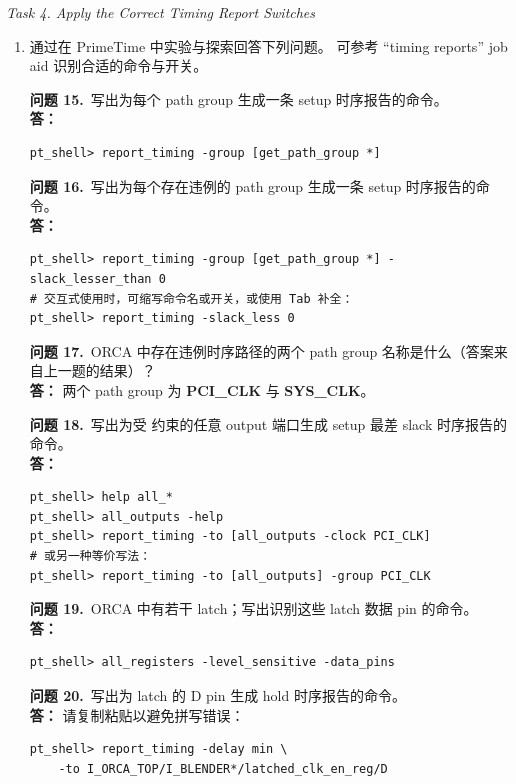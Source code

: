 \noindent\textit{Task 4. Apply the Correct Timing Report Switches}

\begin{enumerate}
  \item 通过在 PrimeTime 中实验与探索回答下列问题。
        可参考 ``timing reports'' job aid 识别合适的命令与开关。

\begin{questionBox}
\textbf{问题 15.}\ 写出为每个 path group 生成一条 setup 时序报告的命令。\\[0.35em]
\textbf{答：}\\
\begin{lstlisting}
pt_shell> report_timing -group [get_path_group *]
\end{lstlisting}

\textbf{问题 16.}\ 写出为每个存在违例的 path group 生成一条 setup 时序报告的命令。\\[0.35em]
\textbf{答：}\\
\begin{lstlisting}
pt_shell> report_timing -group [get_path_group *] -slack_lesser_than 0
# 交互式使用时，可缩写命令名或开关，或使用 Tab 补全：
pt_shell> report_timing -slack_less 0
\end{lstlisting}

\textbf{问题 17.}\ ORCA 中存在违例时序路径的两个 path group 名称是什么（答案来自上一题的结果）？\\[0.35em]
\textbf{答：} 两个 path group 为 \textbf{PCI\_CLK} 与 \textbf{SYS\_CLK}。

\textbf{问题 18.}\ 写出为受  约束的任意 output 端口生成 setup 最差 slack 时序报告的命令。\\[0.35em]
\textbf{答：}\\
\begin{lstlisting}
pt_shell> help all_*
pt_shell> all_outputs -help
pt_shell> report_timing -to [all_outputs -clock PCI_CLK]
# 或另一种等价写法：
pt_shell> report_timing -to [all_outputs] -group PCI_CLK
\end{lstlisting}

\textbf{问题 19.}\ ORCA 中有若干 latch；写出识别这些 latch 数据 pin 的命令。\\[0.35em]
\textbf{答：}\\
\begin{lstlisting}
pt_shell> all_registers -level_sensitive -data_pins
\end{lstlisting}

\textbf{问题 20.}\ 写出为  latch 的 D pin 生成 hold 时序报告的命令。\\[0.35em]
\textbf{答：} 请复制粘贴以避免拼写错误：
\begin{lstlisting}
pt_shell> report_timing -delay min \
    -to I_ORCA_TOP/I_BLENDER*/latched_clk_en_reg/D
\end{lstlisting}
\end{questionBox}
\end{enumerate}

